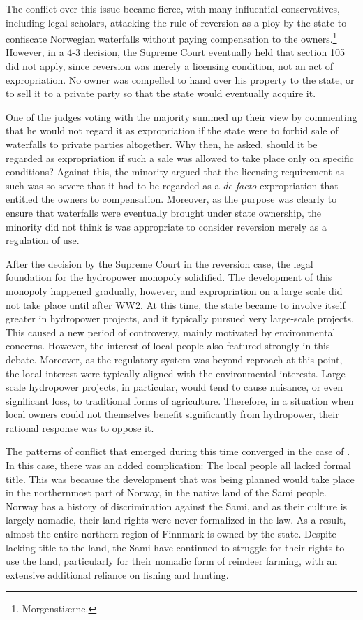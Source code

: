 The conflict over this issue became fierce, with many influential conservatives, including legal scholars, attacking the rule of reversion as a ploy by the state to confiscate Norwegian waterfalls without paying compensation to the owners.\footnote{Morgenstiærne.} However, in a 4-3 decision, the Supreme Court eventually held that section 105 did not apply, since reversion was merely a licensing condition, not an act of expropriation. No owner was compelled to hand over his property to the state, or to sell it to a private party so that the state would eventually acquire it.

One of the judges voting with the majority summed up their view by commenting that he would not regard it as expropriation if the state were to forbid sale of waterfalls to private parties altogether. Why then, he asked, should it be regarded as expropriation if such a sale was allowed to take place only on specific conditions? Against this, the minority argued that the licensing requirement as such was so severe that it had to be regarded as a {\it de facto} expropriation that entitled the owners to compensation. Moreover,  as the purpose was clearly to ensure that waterfalls were eventually brought under state ownership, the minority did not think is was appropriate to consider reversion merely as a regulation of use.

After the decision by the Supreme Court in the reversion case, the legal foundation for the hydropower monopoly solidified. The development of this monopoly happened gradually, however, and expropriation on a large scale did not take place until after WW2. At this time, the state became to involve itself greater in hydropower projects, and it typically pursued very large-scale projects. This caused a new period of controversy, mainly motivated by environmental concerns. However, the interest of local people also featured strongly in this debate. Moreover, as the regulatory system was beyond reproach at this point, the local interest were typically aligned with the environmental interests. Large-scale hydropower projects, in particular, would tend to cause nuisance, or even significant loss, to traditional forms of agriculture. Therefore, in a situation when local owners could not themselves benefit significantly from hydropower, their rational response was to oppose it.

The patterns of conflict that emerged during this time converged in the case of \cite{alta8.}. In this case, there was an added complication: The local people all lacked formal title. This was because the development that was being planned would take place in the northernmost part of Norway, in the native land of the Sami people. Norway has a history of discrimination against the Sami, and as their culture is largely nomadic, their land rights were never formalized in the law. As a result, almost the entire northern region of Finnmark is owned by the state. Despite lacking title to the land, the Sami have continued to struggle for their rights to use the land, particularly for their nomadic form of reindeer farming, with an extensive additional reliance on fishing and hunting.

